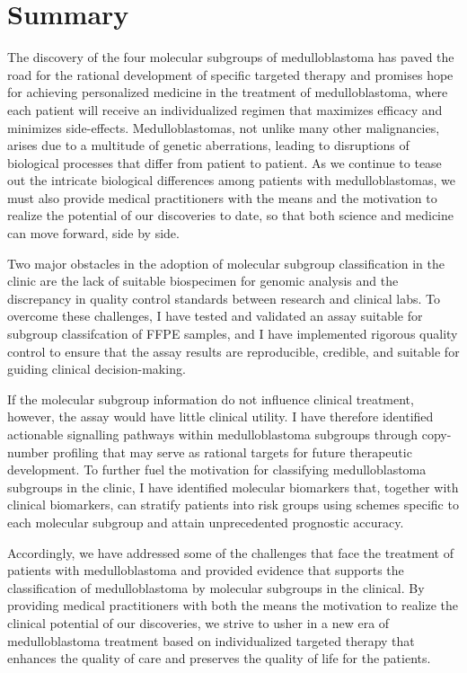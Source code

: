 \documentclass[11pt,letterpaper]{article}
\theoremstyle{definition}
\begin{document}
\clearpage



\clearpage

\section*{Summary}

The discovery of the four molecular subgroups of medulloblastoma has paved the road for the rational development of specific targeted therapy and promises hope for achieving personalized medicine in the treatment of medulloblastoma, where each patient will receive an individualized regimen that maximizes efficacy and minimizes side-effects. Medulloblastomas, not unlike many other malignancies, arises due to a multitude of genetic aberrations, leading to disruptions of biological processes that differ from patient to patient. As we continue to tease out the intricate biological differences among patients with medulloblastomas, we must also provide medical practitioners with the means and the motivation to realize the potential of our discoveries to date, so that both science and medicine can move forward, side by side.

Two major obstacles in the adoption of molecular subgroup classification in the clinic are the lack of suitable biospecimen for genomic analysis and the discrepancy in quality control standards between research and clinical labs. To overcome these challenges, I have tested and validated an assay suitable for subgroup classifcation of FFPE samples, and I have implemented rigorous quality control to ensure that the assay results are reproducible, credible, and suitable for guiding clinical decision-making.

If the molecular subgroup information do not influence clinical treatment, however, the assay would have little clinical utility. I have therefore identified actionable signalling pathways within medulloblastoma subgroups through copy-number profiling that may serve as rational targets for future therapeutic development. To further fuel the motivation for classifying medulloblastoma subgroups in the clinic, I have identified molecular biomarkers that, together with clinical biomarkers, can stratify patients into risk groups using schemes specific to each molecular subgroup and attain unprecedented prognostic accuracy.

Accordingly, we have addressed some of the challenges that face the treatment of patients with medulloblastoma and provided evidence that supports the classification of medulloblastoma by molecular subgroups in the clinical. By providing medical practitioners with both the means the motivation to realize the clinical potential of our discoveries, we strive to usher in a new era of medulloblastoma treatment based on individualized targeted therapy that enhances the quality of care and preserves the quality of life for the patients.

\clearpage


\begin{multicols}{2}
\small
{}
\end{multicols}
\end{document}

